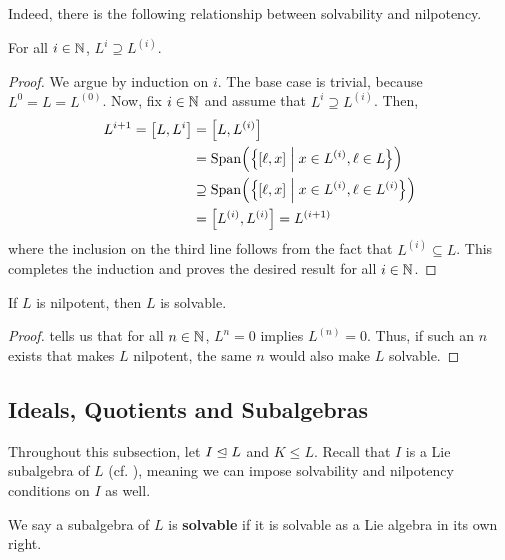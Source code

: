 Indeed, there is the following relationship between solvability and nilpotency.

\begin{lemma}\label{Ch1:Lemma:DerivedSeriesContainedInLowerCentralSeries}
    For all $i \in \mathbb{N}$, $L^i \supseteq L^{(i)}$.
\end{lemma}
\begin{proof}
    We argue by induction on $i$. The base case is trivial, because $L^0 = L = L^{(0)}$. Now, fix $i \in \mathbb{N}$ and assume that $L^i \supseteq L^{(i)}$. Then,
    \begin{align*}
        L^{i + 1}
        = \left[ L, L^i \right] &= \left[ L, L^{(i)} \right] \\
        &= \operatorname{Span}\!\left( \left\{ \left[ \ell, x \right] \; \middle\vert \; x \in L^{(i)}, \ell \in L \right\} \right) \\
        &\supseteq \operatorname{Span}\!\left( \left\{ \left[ \ell, x \right] \; \middle\vert \; x \in L^{(i)}, \ell \in L^{(i)} \right\} \right) \\
        &= \left[ L^{(i)}, L^{(i)} \right] = L^{(i + 1)}
    \end{align*}
    where the inclusion on the third line follows from the fact that $L^{(i)} \subseteq L$. This completes the induction and proves the desired result for all $i \in \mathbb{N}$.
\end{proof}

\begin{boxcorollary}
    If $L$ is nilpotent, then $L$ is solvable.
\end{boxcorollary}
\begin{proof}
     tells us that for all $n \in \mathbb{N}$, $L^n = 0$ implies $L^{(n)} = 0$. Thus, if such an $n$ exists that makes $L$ nilpotent, the same $n$ would also make $L$ solvable.
\end{proof}

\subsection{Ideals, Quotients and Subalgebras}

Throughout this subsection, let $I \trianglelefteq L$ and $K \leq L$. Recall that $I$ is a Lie subalgebra of $L$ (cf. ), meaning we can impose solvability and nilpotency conditions on $I$ as well.

\begin{definition}
    We say a subalgebra of $L$ is \textbf{solvable} if it is solvable as a Lie algebra in its own right.
\end{definition}

